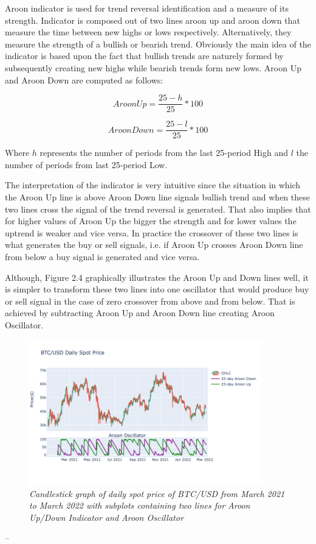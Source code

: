 Aroon indicator is used for trend reversal identification and a measure of its strength. Indicator is composed out of two lines aroon up and aroon down that measure the time between new highs or lows respectively. Alternatively, they measure the strength of a bullish or bearish trend. Obviously the main idea of the indicator is based upon the fact that bullish trends are naturely formed by subsequently creating new highs while bearish trends form new lows. Aroon Up and Aroon Down are computed as follows:

\begin{equation}
Aroon Up = \frac{25 - h}{25} * 100
\end{equation}
 
\begin{equation}
Aroon Down = \frac{25 - l}{25} * 100
\end{equation}

Where $h$ represents the number of periods from the last 25-period High and $l$ the number of periods from last 25-period Low. 

The interpretation of the indicator is very intuitive since the situation in which the Aroon Up line is above Aroon Down line signals bullish trend and when these two lines cross the signal of the trend reversal is generated. That also implies that for higher values of Aroon Up the bigger the strength and for lower values the uptrend is weaker and vice versa. In practice the crossover of these two lines is what generates the buy or sell signals, i.e. if Aroon Up crosses Aroon Down line from below a buy signal is generated and vice versa. 

Although, Figure 2.4 graphically illustrates the Aroon Up and Down lines well, it is simpler to transform these two lines into one oscillator that would produce buy or sell signal in the case of zero crossover from above and from below. That is achieved by subtracting Aroon Up and Aroon Down line creating Aroon Oscillator.


\begin{figure}[h]

\begin{center}
	\includegraphics[width=0.9\textwidth]{Aroon.png}
\end{center}

\caption{\textit{ Candlestick graph of daily spot price of BTC/USD from March 2021 to March 2022 with subplots containing two lines for Aroon Up/Down Indicator and Aroon Oscillator}}

\end{figure}


--




